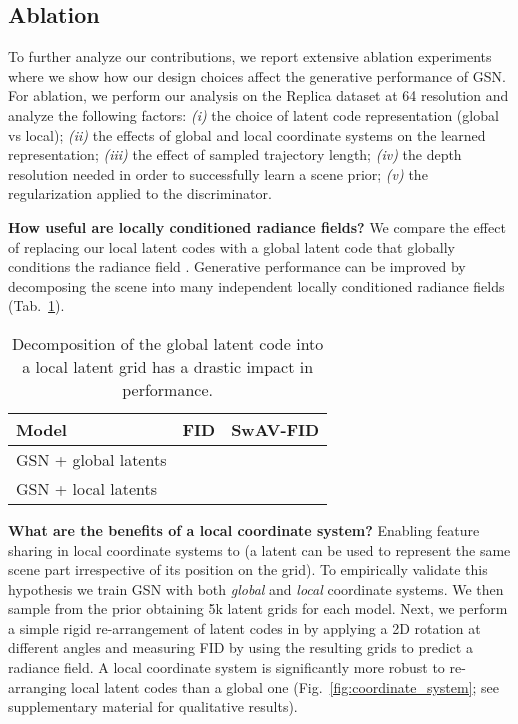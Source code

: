 \documentclass[10pt,twocolumn,letterpaper]{article}
\begin{document}
\subsection{Ablation}

To further analyze our contributions, we report extensive ablation experiments where we show how our design choices affect the generative performance of GSN. For ablation, we perform our analysis on the Replica dataset \cite{replica} at 64  resolution and analyze the following factors: \textit{(i)} the choice of latent code representation (global vs local); \textit{(ii)} the effects of global and local coordinate systems on the learned representation; \textit{(iii)} the effect of sampled trajectory length; \textit{(iv)} the depth resolution needed in order to successfully learn a scene prior; \textit{(v)} the regularization applied to the discriminator.

\textbf{How useful are locally conditioned radiance fields?} We compare the effect of replacing our local latent codes  with a global latent code  that globally conditions the radiance field . Generative performance can be improved by decomposing the scene into many independent locally conditioned radiance fields (Tab.~\ref{tab:latent_code_ablation}).

\begin{table}[!h]
\small
\begin{center}
 \begin{tabular}{lcc}
 \toprule
 Model & FID  & SwAV-FID  \\
 \midrule
 GSN + global latents &  &  \\
 GSN + local latents &  &  \\
 \bottomrule

\end{tabular}
\end{center}
\caption{Decomposition of the global latent code into a local latent grid has a drastic impact in performance.}
\label{tab:latent_code_ablation}
\end{table}

\textbf{What are the benefits of a local coordinate system?}
Enabling feature sharing in local coordinate systems to  (\eg a latent  can be used to represent the same scene part irrespective of its position  on the grid). To empirically validate this hypothesis we train GSN with both \textit{global} and \textit{local} coordinate systems. We then sample from the prior obtaining 5k latent grids  for each model. Next, we perform a simple rigid re-arrangement of latent codes in  by applying a 2D rotation at different angles and measuring FID by using the resulting grids to predict a radiance field. A local coordinate system is significantly more robust to re-arranging local latent codes than a global one (Fig.~\ref{fig:coordinate_system}; see supplementary material for qualitative results).
\end{document}
